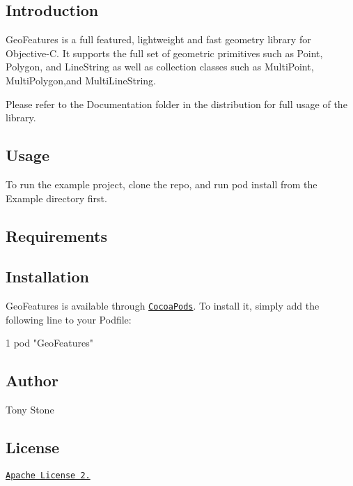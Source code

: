 \subsection*{Introduction}

Geo\+Features is a full featured, lightweight and fast geometry library for Objective-\/\+C. It supports the full set of geometric primitives such as Point, Polygon, and Line\+String as well as collection classes such as Multi\+Point, Multi\+Polygon,and Multi\+Line\+String.

Please refer to the Documentation folder in the distribution for full usage of the library.

\subsection*{Usage}

To run the example project, clone the repo, and run {\ttfamily pod install} from the Example directory first.

\subsection*{Requirements}

\subsection*{Installation}

Geo\+Features is available through \href{http://cocoapods.org}{\tt Cocoa\+Pods}. To install it, simply add the following line to your Podfile\+:


\begin{DoxyCode}
1 pod "GeoFeatures"
\end{DoxyCode}


\subsection*{Author}

Tony Stone

\subsection*{License}

\href{http://www.apache.org/licenses/LICENSE-2.0.html}{\tt Apache License 2.} 